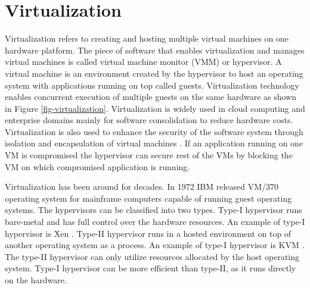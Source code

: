 

\section{Virtualization} %
Virtualization refers to creating and hosting multiple virtual machines on one hardware platform.
The piece of software that enables virtualization and manages virtual machines is called virtual machine monitor (VMM) or hypervisor.
A virtual machine is an environment created by the hypervisor to host an operating system with applications running on top called guests.
Virtualization technology enables concurrent execution of multiple guests on the same hardware as shown in Figure \ref{fig-virtualization}.
Virtualization is widely used in cloud computing and enterprise domains mainly for software consolidation to reduce hardware costs.
Virtualization is also used to enhance the security of the software system through isolation and encapsulation of virtual machines \cite{bazargan2012state}.
If an application running on one VM is compromised the hypervisor can secure rest of the VMs by blocking the VM on which compromised application is running.



Virtualization has been around for decades. In 1972 IBM released VM/370 operating system for mainframe computers capable of running guest operating systems.
The hypervisors can be classified into two types.
Type-I hypervisor runs bare-metal and has full control over the hardware resources.
An example of type-I hypervisor is Xen \cite{Barham:2003:XAV:1165389.945462}.
Type-II hypervisor runs in a hosted environment on top of another operating system as a process.
An example of type-I hypervisor is KVM \cite{kivity2007kvm}.
The type-II hypervisor can only utilize resources allocated by the host operating system.
Type-I hypervisor can be more efficient than type-II, as it runs directly on the hardware.

